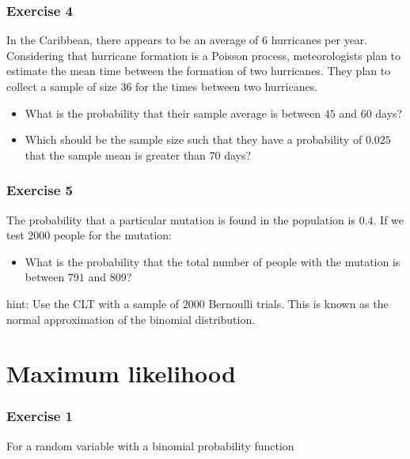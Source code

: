 \documentclass[
]{book}
\providecommand{\tightlist}{%
  \setlength{\itemsep}{0pt}\setlength{\parskip}{0pt}}
\begin{document}
\hypertarget{exercise-4-3}{%
\subsubsection{Exercise 4}\label{exercise-4-3}}

In the Caribbean, there appears to be an average of \(6\) hurricanes per year. Considering that hurricane formation is a Poisson process, meteorologists plan to estimate the mean time between the formation of two hurricanes. They plan to collect a sample of size \(36\) for the times between two hurricanes.

\begin{itemize}
\item
  What is the probability that their sample average is between \(45\) and \(60\) days?
\item
  Which should be the sample size such that they have a probability of \(0.025\) that the sample mean is greater than \(70\) days?
\end{itemize}

\hypertarget{exercise-5-2}{%
\subsubsection{Exercise 5}\label{exercise-5-2}}

The probability that a particular mutation is found in the population is \(0.4\). If we test \(2000\) people for the mutation:

\begin{itemize}
\tightlist
\item
  What is the probability that the total number of people with the mutation is between \(791\) and \(809\)?
\end{itemize}

hint: Use the CLT with a sample of \(2000\) Bernoulli trials. This is known as the normal approximation of the binomial distribution.

\hypertarget{maximum-likelihood-7}{%
\section{Maximum likelihood}\label{maximum-likelihood-7}}

\hypertarget{exercise-1-7}{%
\subsubsection{Exercise 1}\label{exercise-1-7}}

For a random variable with a binomial probability function
\end{document}
